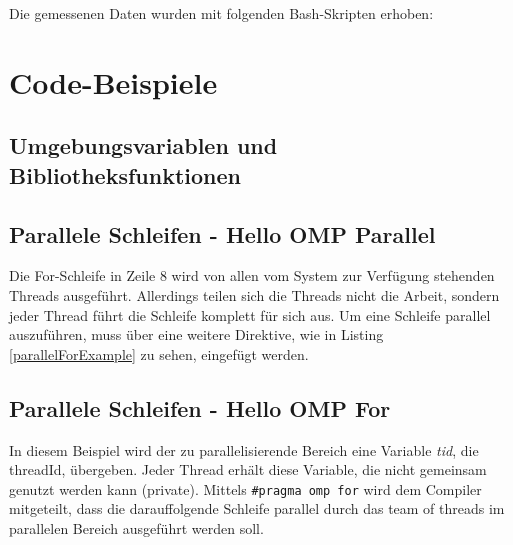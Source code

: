 \documentclass[11pt]{scrartcl}
\begin{document}
Die gemessenen Daten wurden mit folgenden Bash-Skripten erhoben:





\pagebreak
\section{Code-Beispiele}

\subsection{Umgebungsvariablen und Bibliotheksfunktionen}



\subsection{Parallele Schleifen - Hello OMP Parallel}



Die For-Schleife in Zeile 8 wird von allen vom System zur Verfügung stehenden Threads ausgeführt. Allerdings teilen sich die Threads nicht die Arbeit, sondern jeder Thread führt die Schleife komplett für sich aus. Um eine Schleife parallel auszuführen, muss über eine weitere Direktive, wie in Listing \ref{parallelForExample} zu sehen, eingefügt werden. 

\subsection{Parallele Schleifen - Hello OMP For}

In diesem Beispiel wird der zu parallelisierende Bereich eine Variable \textit{tid}, die threadId, übergeben. Jeder Thread erhält diese Variable, die nicht gemeinsam genutzt werden kann (private). Mittels \texttt{\#pragma omp for} wird dem Compiler mitgeteilt, dass die darauffolgende Schleife parallel durch das team of threads  im parallelen Bereich ausgeführt werden soll.
\end{document}
